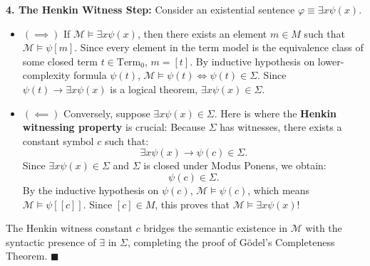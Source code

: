 \begin{solution}
\textbf{4. The Henkin Witness Step:}
Consider an existential sentence $\varphi \equiv \exists x \psi(x)$.
\begin{itemize}[leftmargin=1.4em,itemsep=2pt]
  \item $(\implies)$ If $\mathcal{M} \models \exists x \psi(x)$, then there exists an element $m \in M$ such that $\mathcal{M} \models \psi[m]$.
  Since every element in the term model is the equivalence class of some closed term $t \in \mathrm{Term}_0$, $m = [t]$.
  By inductive hypothesis on lower-complexity formula $\psi(t)$, $\mathcal{M} \models \psi(t) \iff \psi(t) \in \Sigma$.
  Since $\psi(t) \to \exists x \psi(x)$ is a logical theorem, $\exists x \psi(x) \in \Sigma$.
  \item $(\impliedby)$ Conversely, suppose $\exists x \psi(x) \in \Sigma$.
  Here is where the \textbf{Henkin witnessing property} is crucial:
  Because $\Sigma$ has witnesses, there exists a constant symbol $c$ such that:
  \[
  \exists x \psi(x) \to \psi(c) \in \Sigma.
  \]
  Since $\exists x \psi(x) \in \Sigma$ and $\Sigma$ is closed under Modus Ponens, we obtain:
  \[
  \psi(c) \in \Sigma.
  \]
  By the inductive hypothesis on $\psi(c)$, $\mathcal{M} \models \psi(c)$, which means $\mathcal{M} \models \psi[[c]]$.
  Since $[c] \in M$, this proves that $\mathcal{M} \models \exists x \psi(x)$!
\end{itemize}
The Henkin witness constant $c$ bridges the semantic existence in $\mathcal{M}$ with the syntactic presence of $\exists$ in $\Sigma$, completing the proof of G\"odel's Completeness Theorem. \hfill $\blacksquare$
\end{solution}
